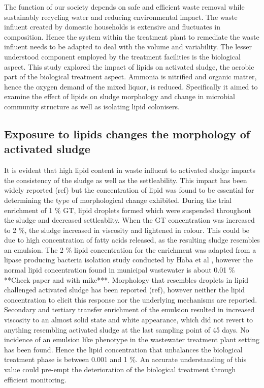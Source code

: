 \documentclass[11pt]{article}
\begin{document}
The function of our society depends on safe and efficient waste removal while sustainably recycling water and reducing environmental impact. The waste influent created by domestic households is extensive and fluctuates in composition. Hence the system within the treatment plant to remediate the waste influent needs to be adapted to deal with the volume and variability. The lesser understood component employed by the treatment facilities is the biological aspect. This study explored the impact of lipids on activated sludge, the aerobic part of the biological treatment aspect. Ammonia is nitrified and organic matter, hence the oxygen demand of the mixed liquor, is reduced. Specifically it aimed to examine the effect of lipids on sludge morphology and change in microbial community structure as well as isolating lipid colonisers.

\subsection{Exposure to lipids changes the morphology of activated sludge}
It is evident that high lipid content in waste influent to activated sludge impacts the consistency of the sludge as well as the settleability. This impact has been widely reported (ref) but the concentration of lipid was found to be essential for determining the type of morphological change exhibited. During the trial enrichment of 1 \% GT, lipid droplets formed which were suspended throughout the sludge and decreased settleablity. When the GT concentration was increased to 2 \%, the sludge increased in viscosity and lightened in colour. This could be due to high concentration of fatty acids released, as the resulting sludge resembles an emulsion. The 2 \% lipid concentration for the enrichment was adapted from a lipase producing bacteria isolation study conducted by Haba et al \cite{haba2000isolation}, however the normal lipid concentration found in municipal wastewater is about 0.01 \% {\LARGE ***Check paper and with mike***}. Morphology that resembles droplets in lipid challenged activated sludge has been reported (ref), however neither the lipid concentration to elicit this response nor the underlying mechanisms are reported. Secondary and tertiary transfer enrichment of the emulsion resulted in increased viscosity to an almost solid state and white appearance, which did not revert to anything resembling activated sludge at the last sampling point of 45 days. No incidence of an emulsion like phenotype in the wastewater treatment plant setting has been found. Hence the lipid concentration that unbalances the biological treatment phase is between 0.001 and 1 \%. An accurate understanding of this value could pre-empt the deterioration of the biological treatment through efficient monitoring.
\end{document}

